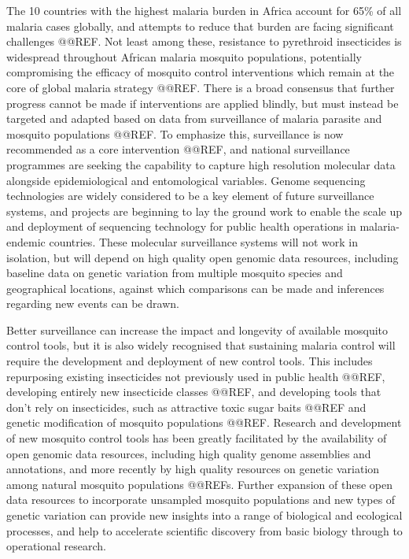 \documentclass[a4paper,11pt,abstracton,hidelinks]{scrartcl}
\begin{document}
%
The 10 countries with the highest malaria burden in Africa account for 65\% of all malaria cases globally, and attempts to reduce that burden are facing significant challenges @@REF.
%
Not least among these, resistance to pyrethroid insecticides is widespread throughout African malaria mosquito populations, potentially compromising the efficacy of mosquito control interventions which remain at the core of global malaria strategy @@REF.
%
There is a broad consensus that further progress cannot be made if interventions are applied blindly, but must instead be targeted and adapted based on data from surveillance of malaria parasite and mosquito populations @@REF.
%
To emphasize this, surveillance is now recommended as a core intervention @@REF, and national surveillance programmes are seeking the capability to capture high resolution molecular data alongside epidemiological and entomological variables.
%
Genome sequencing technologies are widely considered to be a key element of future surveillance systems, and projects are beginning to lay the ground work to enable the scale up and deployment of sequencing technology for public health operations in malaria-endemic countries.
%
These molecular surveillance systems will not work in isolation, but will depend on high quality open genomic data resources, including baseline data on genetic variation from multiple mosquito species and geographical locations, against which comparisons can be made and inferences regarding new events can be drawn.

%
Better surveillance can increase the impact and longevity of available mosquito control tools, but it is also widely recognised that sustaining malaria control will require the development and deployment of new control tools.
%
This includes repurposing existing insecticides not previously used in public health @@REF, developing entirely new insecticide classes @@REF, and developing tools that don't rely on insecticides, such as attractive toxic sugar baits @@REF and genetic modification of mosquito populations @@REF.
%
Research and development of new mosquito control tools has been greatly facilitated by the availability of open genomic data resources, including high quality genome assemblies and annotations, and more recently by high quality resources on genetic variation among natural mosquito populations @@REFs. 
%
Further expansion of these open data resources to incorporate unsampled mosquito populations and new types of genetic variation can provide new insights into a range of biological and ecological processes, and help to accelerate scientific discovery from basic biology through to operational research.
\end{document}

